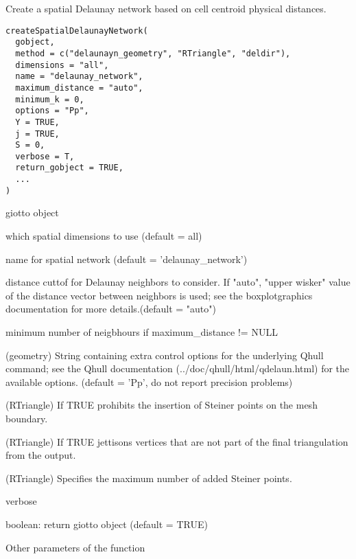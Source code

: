\documentclass[a4paper]{book}
\begin{document}
%
\begin{Description}\relax
Create a spatial Delaunay network based on cell centroid physical distances.
\end{Description}
%
\begin{Usage}
\begin{verbatim}
createSpatialDelaunayNetwork(
  gobject,
  method = c("delaunayn_geometry", "RTriangle", "deldir"),
  dimensions = "all",
  name = "delaunay_network",
  maximum_distance = "auto",
  minimum_k = 0,
  options = "Pp",
  Y = TRUE,
  j = TRUE,
  S = 0,
  verbose = T,
  return_gobject = TRUE,
  ...
)
\end{verbatim}
\end{Usage}
%
\begin{Arguments}
\begin{ldescription}
\item[\code{gobject}] giotto object

\item[\code{dimensions}] which spatial dimensions to use (default = all)

\item[\code{name}] name for spatial network (default = 'delaunay\_network')

\item[\code{maximum\_distance}] distance cuttof for Delaunay neighbors to consider. If "auto", "upper wisker" value of the distance vector between neighbors is used; see the boxplotgraphics documentation for more details.(default = "auto")

\item[\code{minimum\_k}] minimum number of neigbhours if maximum\_distance != NULL

\item[\code{options}] (geometry) String containing extra control options for the underlying Qhull command; see the Qhull documentation (../doc/qhull/html/qdelaun.html) for the available options. (default = 'Pp', do not report precision problems)

\item[\code{Y}] (RTriangle) If TRUE prohibits the insertion of Steiner points on the mesh boundary.

\item[\code{j}] (RTriangle) If TRUE jettisons vertices that are not part of the final triangulation from the output.

\item[\code{S}] (RTriangle) Specifies the maximum number of added Steiner points.

\item[\code{verbose}] verbose

\item[\code{return\_gobject}] boolean: return giotto object (default = TRUE)

\item[\code{...}] Other parameters of the  function
\end{ldescription}
\end{Arguments}
\end{document}
